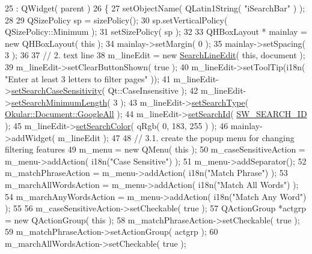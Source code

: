 \begin{DoxyCode}
25     : QWidget( parent )
26 \{
27     setObjectName( QLatin1String( \textcolor{stringliteral}{"iSearchBar"} ) );
28 
29     QSizePolicy sp = sizePolicy();
30     sp.setVerticalPolicy( QSizePolicy::Minimum );
31     setSizePolicy( sp );
32 
33     QHBoxLayout * mainlay = \textcolor{keyword}{new} QHBoxLayout( \textcolor{keyword}{this} );
34     mainlay->setMargin( 0 );
35     mainlay->setSpacing( 3 );
36 
37     \textcolor{comment}{// 2. text line}
38     m\_lineEdit = \textcolor{keyword}{new} \hyperlink{classSearchLineEdit}{SearchLineEdit}( \textcolor{keyword}{this}, document );
39     m\_lineEdit->setClearButtonShown( \textcolor{keyword}{true} );
40     m\_lineEdit->setToolTip(i18n( \textcolor{stringliteral}{"Enter at least 3 letters to filter pages"} ));
41     m\_lineEdit->\hyperlink{classSearchLineEdit_a81cd95f5a0bf612d83f4ead3999d926b}{setSearchCaseSensitivity}( Qt::CaseInsensitive );
42     m\_lineEdit->\hyperlink{classSearchLineEdit_a2743adac78c82e7651e68807e88b3cbf}{setSearchMinimumLength}( 3 );
43     m\_lineEdit->\hyperlink{classSearchLineEdit_a8dc6fe77273e78adf9c95c641ef1de2b}{setSearchType}( \hyperlink{classOkular_1_1Document_af4b4b32563d6013d6da10be1667a7bada6f81a31b92307bd8a97aca7c109b3239}{Okular::Document::GoogleAll} );
44     m\_lineEdit->\hyperlink{classSearchLineEdit_a00ff87a591108a7a3cad4c29b062e9d2}{setSearchId}( \hyperlink{core_2document_8h_ada2c5c36e5b2a4bb2be2ec9e4ceb0886}{SW\_SEARCH\_ID} );
45     m\_lineEdit->\hyperlink{classSearchLineEdit_ae3ebd6c29d91280797bed839c92b8c82}{setSearchColor}( qRgb( 0, 183, 255 ) );
46     mainlay->addWidget( m\_lineEdit );
47 
48     \textcolor{comment}{// 3.1. create the popup menu for changing filtering features}
49     m\_menu = \textcolor{keyword}{new} QMenu( \textcolor{keyword}{this} );
50     m\_caseSensitiveAction = m\_menu->addAction( i18n(\textcolor{stringliteral}{"Case Sensitive"}) );
51     m\_menu->addSeparator();
52     m\_matchPhraseAction = m\_menu->addAction( i18n(\textcolor{stringliteral}{"Match Phrase"}) );
53     m\_marchAllWordsAction = m\_menu->addAction( i18n(\textcolor{stringliteral}{"Match All Words"}) );
54     m\_marchAnyWordsAction = m\_menu->addAction( i18n(\textcolor{stringliteral}{"Match Any Word"}) );
55 
56     m\_caseSensitiveAction->setCheckable( \textcolor{keyword}{true} );
57     QActionGroup *actgrp = \textcolor{keyword}{new} QActionGroup( \textcolor{keyword}{this} );
58     m\_matchPhraseAction->setCheckable( \textcolor{keyword}{true} );
59     m\_matchPhraseAction->setActionGroup( actgrp );
60     m\_marchAllWordsAction->setCheckable( \textcolor{keyword}{true} );

\end{DoxyCode}
